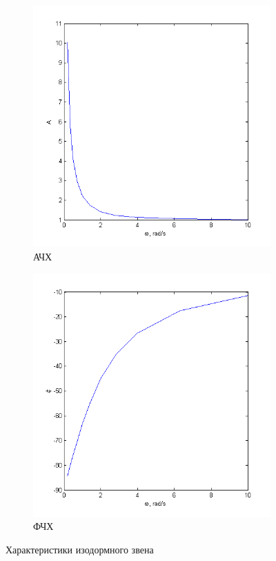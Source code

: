 \documentclass[a4paper, 11pt, russian]{article}
\begin{document}
\begin{figure}[ht!]
        \begin{subfigure}[h]{0.44\textwidth}
            \includegraphics[width = \textwidth]{isodromusLinkAFR}
            \caption{АЧХ}
        \end{subfigure}
        \hfill
        \begin{subfigure}[h]{0.44\textwidth}
            \includegraphics[width = \textwidth]{isodromusLinkPFR}
            \caption{ФЧХ}
        \end{subfigure}
        \caption{Характеристики изодормного звена}
    \end{figure}
\end{document}
